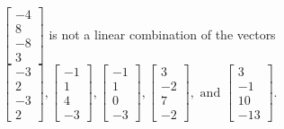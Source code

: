 \begin{exercise}
\begin{exerciseStatement}
  \end{exerciseStatement}
  \begin{exerciseAnswer}
   \(\left[\begin{array}{c}
-4 \\
8 \\
-8 \\
3
\end{array}\right]\) 
  	 is not  
	a linear combination of the vectors \(\left[\begin{array}{c}
-3 \\
2 \\
-3 \\
2
\end{array}\right] , \left[\begin{array}{c}
-1 \\
1 \\
4 \\
-3
\end{array}\right] , \left[\begin{array}{c}
-1 \\
1 \\
0 \\
-3
\end{array}\right] , \left[\begin{array}{c}
3 \\
-2 \\
7 \\
-2
\end{array}\right] , \text{ and } \left[\begin{array}{c}
3 \\
-1 \\
10 \\
-13
\end{array}\right]\).

	
  


  \end{exerciseAnswer}
\end{exercise}